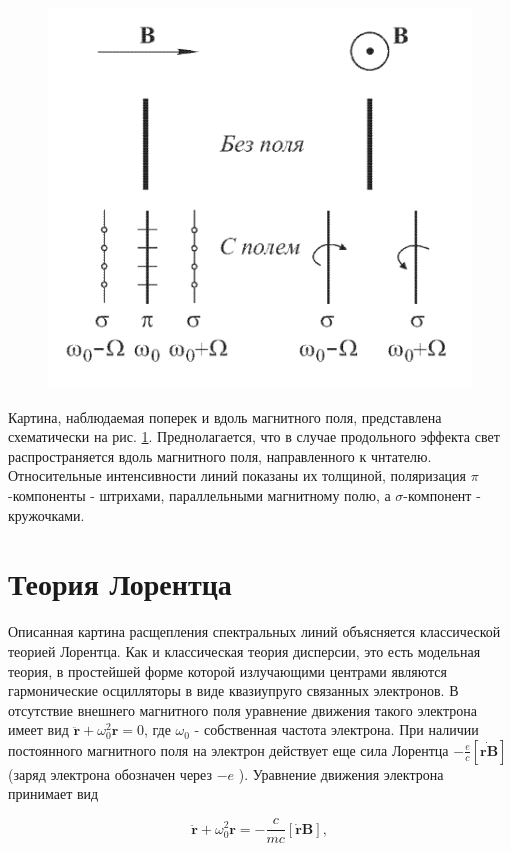 \documentclass[12pt]{article}
\begin{document}
  \begin{figure}
    \centering
    \includegraphics[]{pole.png}
    \caption{}
    \label{fig:pole}
  \end{figure}

  Картина, наблюдаемая поперек и вдоль магнитного поля, представлена схематически на рис. \ref{fig:pole}. Преднолагается, что в случае продольного эффекта свет распространяется вдоль магнитного поля, направленного к чнтателю. Относительные интенсивности линий показаны их толщиной, поляризация $\pi$-компоненты - штрихами, параллельными магнитному полю, а $\sigma$-компонент - кружочками.

  \section{Теория Лорентца}
  Описанная картина расщепления спектральных линий объясняется классической теорией Лорентца. Как и классическая теория дисперсии, это есть модельная теория, в простейшей форме которой излучающими центрами являются гармонические осцилляторы в виде квазиупруго связанных электронов. В отсутствие внешнего магнитного поля уравнение движения такого электрона имеет вид $\ddot{\mathbf{r}}+\omega_0^2 \mathbf{r}=0$, где $\omega_0$ - собственная частота электрона. При наличии постоянного магнитного поля на электрон действует еще сила Лорентца $-\frac{e}{c}[\dot{\mathbf{r B}}]$ (заряд электрона обозначен через $-e$ ). Уравнение движения электрона принимает вид

  \[
  \ddot{\mathbf{r}}+\omega_0^2 \mathbf{r}=-\frac{c}{m c}[\dot{\mathbf{r}} \mathbf{B}],
  \]
\end{document}
